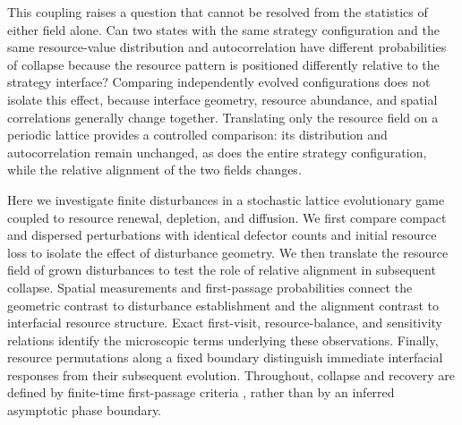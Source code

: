 This coupling raises a question that cannot be resolved from the statistics of either field alone. Can two states with the same strategy configuration and the same resource-value distribution and autocorrelation have different probabilities of collapse because the resource pattern is positioned differently relative to the strategy interface? Comparing independently evolved configurations does not isolate this effect, because interface geometry, resource abundance, and spatial correlations generally change together. Translating only the resource field on a periodic lattice provides a controlled comparison: its distribution and autocorrelation remain unchanged, as does the entire strategy configuration, while the relative alignment of the two fields changes.

Here we investigate finite disturbances in a stochastic lattice evolutionary game coupled to resource renewal, depletion, and diffusion. We first compare compact and dispersed perturbations with identical defector counts and initial resource loss to isolate the effect of disturbance geometry. We then translate the resource field of grown disturbances to test the role of relative alignment in subsequent collapse. Spatial measurements and first-passage probabilities connect the geometric contrast to disturbance establishment and the alignment contrast to interfacial resource structure. Exact first-visit, resource-balance, and sensitivity relations identify the microscopic terms underlying these observations. Finally, resource permutations along a fixed boundary distinguish immediate interfacial responses from their subsequent evolution. Throughout, collapse and recovery are defined by finite-time first-passage criteria \cite{redner2001firstpassage}, rather than by an inferred asymptotic phase boundary.
